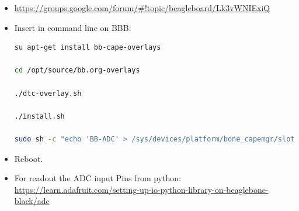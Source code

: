 \documentclass[
	fontsize=10pt
	paper=a4
]{scrartcl}
\begin{document}
\begin{itemize}

\item \url{https://groups.google.com/forum/#!topic/beagleboard/Lk3vWNIExiQ}

\item Insert in command line on BBB:

\begin{lstlisting}[language=bash]
su apt-get install bb-cape-overlays

cd /opt/source/bb.org-overlays

./dtc-overlay.sh

./install.sh

sudo sh -c "echo 'BB-ADC' > /sys/devices/platform/bone_capemgr/slots"
\end{lstlisting}


\item Reboot.

\item For readout the ADC input Pins from python: \url{https://learn.adafruit.com/setting-up-io-python-library-on-beaglebone-black/adc}


\end{itemize}





\end{document}
